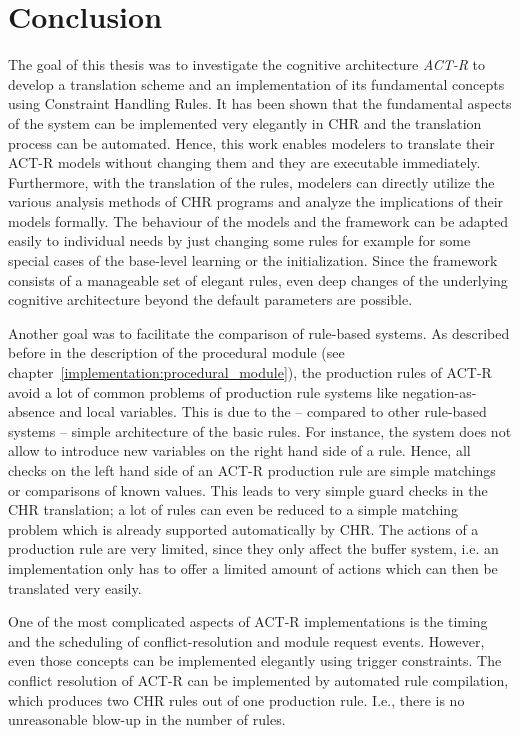 \chapter{Conclusion}
\label{conclusion}

The goal of this thesis was to investigate the cognitive architecture \emph{ACT-R} to develop a translation scheme and an implementation of its fundamental concepts using Constraint Handling Rules. It has been shown that the fundamental aspects of the system can be implemented very elegantly in CHR and the translation process can be automated. Hence, this work enables modelers to translate their ACT-R models without changing them and they are executable immediately. Furthermore, with the translation of the rules, modelers can directly utilize the various analysis methods of CHR programs and analyze the implications of their models formally. The behaviour of the models and the framework can be adapted easily to individual needs by just changing some rules for example for some special cases of the base-level learning or the initialization. Since the framework consists of a manageable set of elegant rules, even deep changes of the underlying cognitive architecture beyond the default parameters are possible.

Another goal was to facilitate the comparison of rule-based systems. As described before in the description of the procedural module (see chapter~\ref{implementation:procedural_module}), the production rules of ACT-R avoid a lot of common problems of production rule systems like negation-as-absence and local variables. This is due to the -- compared to other rule-based systems -- simple architecture of the basic rules. For instance, the system does not allow to introduce new variables on the right hand side of a rule. Hence, all checks on the left hand side of an ACT-R production rule are simple matchings or comparisons of known values. This leads to very simple guard checks in the CHR translation; a lot of rules can even be reduced to a simple matching problem which is already supported automatically by CHR. The actions of a production rule are very limited, since they only affect the buffer system, i.e. an implementation only has to offer a limited amount of actions which can then be translated very easily.

One of the most complicated aspects of ACT-R implementations is the timing and the scheduling of conflict-resolution and module request events. However, even those concepts can be implemented elegantly using trigger constraints. The conflict resolution of ACT-R can be implemented by automated rule compilation, which produces two CHR rules out of one production rule. I.e., there is no unreasonable blow-up in the number of rules.

